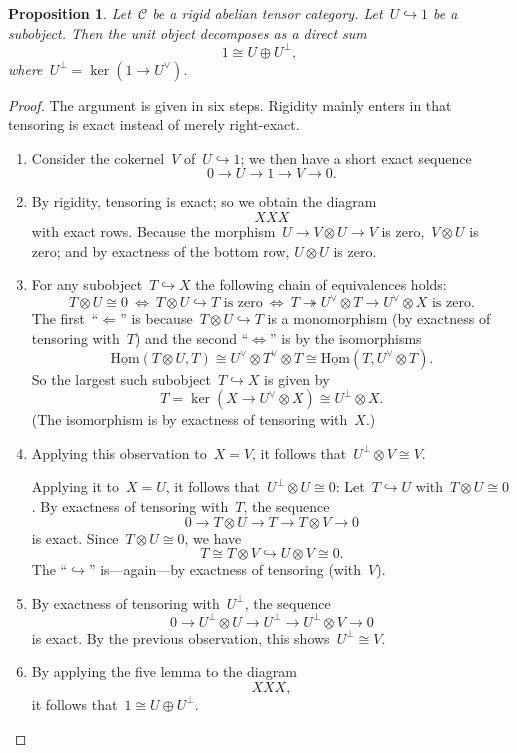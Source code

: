 \documentclass[a4paper,english,12pt]{scrartcl}
\theoremstyle{definition}
\theoremstyle{plain}
\newtheorem{prop}[defn]{Proposition}
\theoremstyle{remark}
\newcommand{\C}{\mathcal{C}}
\renewcommand{\_}{\mathpunct{.}\,}
\newcommand{\?}{\,{:}\,}
\newcommand{\Hom}{\underline{\mathrm{Hom}}}
\begin{document}
\begin{prop}Let~$\C$ be a rigid abelian tensor category. Let~$U \hookrightarrow
1$ be a subobject. Then the unit object decomposes as a direct sum
\[ 1 \cong U \oplus U^\perp, \]
where~$U^\perp = \ker(1 \to U^\vee)$.\end{prop}
\begin{proof}The argument is given in six steps. Rigidity mainly enters in that
tensoring is exact instead of merely right-exact.\begin{enumerate}
\item Consider the cokernel~$V$ of~$U \hookrightarrow 1$; we then have a short
exact sequence
\[ 0 \longrightarrow U \longrightarrow 1 \longrightarrow V \longrightarrow 0.
\]
\item By rigidity, tensoring is exact; so we obtain the diagram
\[ XXX \]
with exact rows. Because the morphism~$U \to V \otimes U \to V$ is zero,~$V
\otimes U$ is zero; and by exactness of the bottom row, $U \otimes U$ is zero.
\item For any subobject~$T \hookrightarrow X$ the following chain of
equivalences holds:
\[ T \otimes U \cong 0
  \ \Longleftrightarrow\ 
  \text{$T \otimes U \hookrightarrow T$ is zero}
  \ \Longleftrightarrow\ 
  \text{$T \twoheadrightarrow U^\vee \otimes T \to U^\vee \otimes X$ is zero}.
  \]
The first~``$\Leftarrow$'' is because~$T \otimes U \hookrightarrow T$ is a
monomorphism (by exactness of tensoring with~$T$) and the second
``$\Leftrightarrow$'' is by the isomorphisms
\[ \Hom(T \otimes U, T) \cong U^\vee \otimes T^\vee \otimes T \cong
  \Hom(T, U^\vee \otimes T). \]
So the largest such subobject~$T \hookrightarrow X$ is given by
\[ T = \ker(X \to U^\vee \otimes X) \cong U^\perp \otimes X. \]
(The isomorphism is by exactness of tensoring with~$X$.)
\item Applying this observation to~$X = V$, it follows that~$U^\perp \otimes V
\cong V$.

Applying it to~$X = U$, it follows that~$U^\perp \otimes U \cong 0$: Let~$T
\hookrightarrow U$ with~$T \otimes U \cong 0$. By exactness of tensoring
with~$T$, the sequence
\[ 0 \longrightarrow T \otimes U \longrightarrow T \longrightarrow T \otimes V
\longrightarrow 0 \]
is exact. Since~$T \otimes U \cong 0$, we have
\[ T \cong T \otimes V \hookrightarrow U \otimes V \cong 0. \]
The ``$\hookrightarrow$'' is---again---by exactness of tensoring (with~$V$).

\item By exactness of tensoring with~$U^\perp$, the sequence
\[ 0 \longrightarrow U^\perp \otimes U \longrightarrow U^\perp \longrightarrow
U^\perp \otimes V \longrightarrow 0 \]
is exact. By the previous observation, this shows~$U^\perp \cong V$.

\item By applying the five lemma to the diagram
\[ XXX, \]
it follows that~$1 \cong U \oplus U^\perp$. \qedhere
\end{enumerate}
\end{proof}
\end{document}
